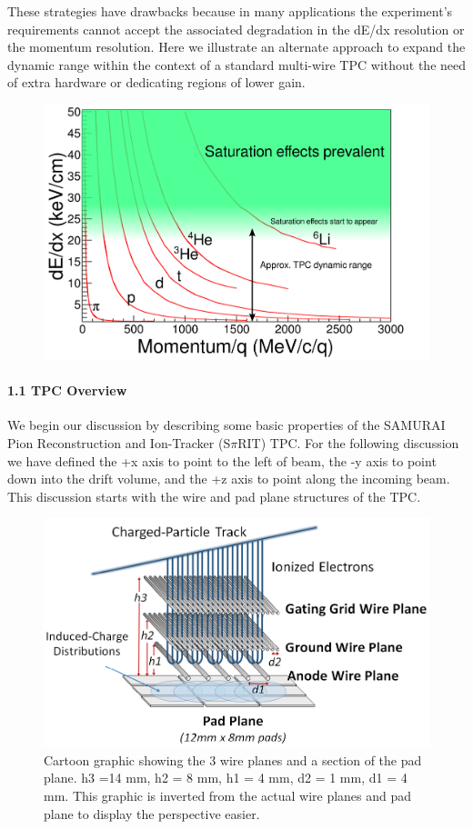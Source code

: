\documentclass[review]{elsarticle}
\begin{document}
 These strategies have drawbacks because in many applications the experiment's requirements cannot accept the associated degradation in the dE/dx resolution or the momentum resolution. Here we illustrate an alternate approach to expand the dynamic range within the context of a standard multi-wire TPC without the need of extra hardware or dedicating regions of lower gain. 
 
\begin{figure}[H]
\includegraphics[width=\linewidth]{intrographic}
\caption{}
\label{fig:intro}
\end{figure}

\paragraph{1.1 TPC Overview}
We begin our discussion by describing some basic properties of the SAMURAI Pion Reconstruction and Ion-Tracker (S$\pi$RIT) TPC. For the following discussion we have defined the +x axis to point to the left of beam, the -y axis to point down into the drift volume, and the +z axis to point along the incoming beam. This discussion starts with the wire and pad plane structures of the TPC. 

\begin{figure}[H]
\includegraphics[width=\linewidth]{padwire}
\caption{Cartoon graphic showing the 3 wire planes and a section of the pad plane. h3 =14 mm, h2 = 8 mm, h1 = 4 mm, d2 = 1 mm, d1 = 4 mm. This graphic is inverted from the actual wire planes and pad plane to display the perspective easier.}
\label{fig:padwire}
\end{figure}
\end{document}
